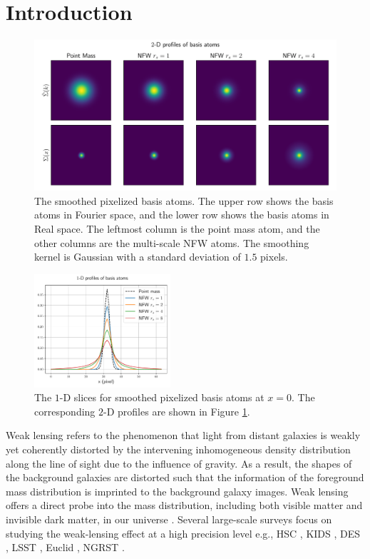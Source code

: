 \documentclass[twocolumn]{aastex63}
\begin{document}
\section{Introduction}

\begin{figure}[!t] \includegraphics[width=1.\textwidth]{nfwlet-atom-2D.pdf}
    \caption{The smoothed pixelized basis atoms. The upper row shows the basis
        atoms in Fourier space, and the lower row shows the basis atoms in Real
        space.  The leftmost column is the point mass atom, and the other
        columns are the multi-scale NFW atoms.  The smoothing kernel is
        Gaussian with a standard deviation of $1.5$ pixels.
    } \label{fig_atoms2D}
\end{figure}

\begin{figure}
 \includegraphics[width=0.45\textwidth]{nfwlet-atom-1D.pdf}
    \caption{The $1$-D slices for smoothed pixelized basis atoms at $x=0$. The
        corresponding $2$-D profiles are shown in Figure \ref{fig_atoms2D}.
    }
 \label{fig_atoms1D}
\end{figure}

Weak lensing refers to the phenomenon that light from distant galaxies is
weakly yet coherently distorted by the intervening inhomogeneous density
distribution along the line of sight due to the influence of gravity.  As a
result, the shapes of the background galaxies are distorted such that the
information of the foreground mass distribution is imprinted to the background
galaxy images. Weak lensing offers a direct probe into the mass distribution,
including both visible matter and invisible dark matter, in our universe
\citep[see][for recent reviews]{revKilbinger15,revRachel17}.
Several large-scale surveys focus on studying the weak-lensing effect at a high
precision level e.g., HSC \citep{HSC1-data}, KIDS \citep{KIDS13}, DES
\citep{DES05}, LSST \citep{LSSTScienceBook}, Euclid \citep{Euclid2011}, NGRST
\citep{WFIRST15}.
\end{document}
